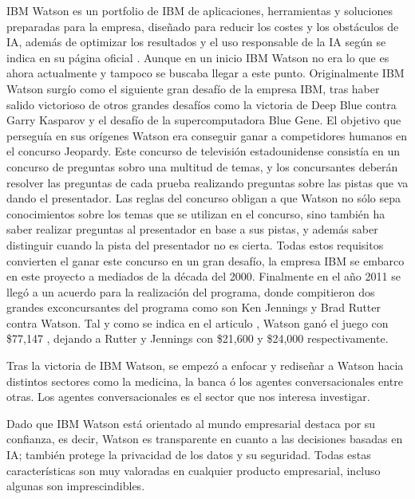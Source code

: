 IBM Watson es un portfolio de IBM de aplicaciones, herramientas y soluciones preparadas para la empresa, diseñado para reducir los costes y los obstáculos de IA, además de optimizar los resultados y el uso responsable de la IA según se indica en su página oficial \cite{RefWorks:RefID:15-2021ibm}. Aunque en un inicio IBM Watson no era lo que es ahora actualmente y tampoco se buscaba llegar a este punto. Originalmente IBM Watson surgío como el siguiente gran desafío de la empresa IBM, tras haber salido victorioso de otros grandes desafíos como la victoria de Deep Blue contra Garry Kasparov y el desafío de la supercomputadora Blue Gene. El objetivo que perseguía en sus orígenes Watson era conseguir ganar a competidores humanos en el concurso Jeopardy. Este concurso de televisión estadounidense consistía en un concurso de preguntas sobro una multitud de temas, y los concursantes deberán resolver las preguntas de cada prueba realizando preguntas sobre las pistas que va dando el presentador. Las reglas del concurso obligan a que Watson no sólo sepa conocimientos sobre los temas que se utilizan en el concurso, sino también ha saber realizar preguntas al presentador en base a sus pistas, y además saber distinguir cuando la pista del presentador no es cierta. Todas estos requisitos convierten el ganar este concurso en un gran desafío, la empresa IBM se embarco en este proyecto a mediados de la década del 2000. Finalmente en el año 2011 se llegó a un acuerdo para la realización del programa, donde compitieron dos grandes exconcursantes del programa como son Ken Jennings y Brad Rutter contra Watson. Tal y como se indica en el articulo \cite{RefWorks:RefID:16-best2013ibm}, Watson ganó el juego con \$77,147 , dejando a Rutter y Jennings con \$21,600 y \$24,000 respectivamente.

Tras la victoria de IBM Watson, se empezó a enfocar y rediseñar a Watson hacia distintos sectores como la medicina, la banca ó los agentes conversacionales entre otras. Los agentes conversacionales es el sector que nos interesa investigar.

Dado que IBM Watson está orientado al mundo empresarial destaca por su confianza, es decir, Watson es transparente en cuanto a las decisiones basadas en IA; también protege la privacidad de los datos y su seguridad. Todas estas características son muy valoradas en cualquier producto empresarial, incluso algunas son imprescindibles.

